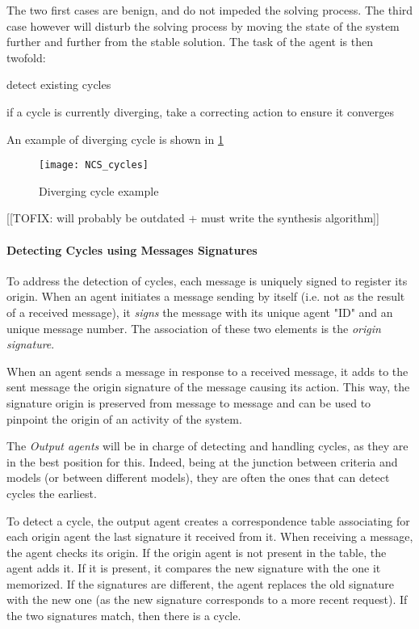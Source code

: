 The two first cases are benign, and do not impeded the solving process. The third case however will disturb the solving process by moving the state of the system further and further from the stable solution. The task of the agent is then twofold:
\begin{compactenum}
\item detect existing cycles
\item if a cycle is currently diverging, take a correcting action to ensure it converges
\end{compactenum}

An example of diverging cycle is shown in \figurename{} \ref{NCS_cycles_fig}

\begin{figure}
\centering
\texttt{[image: NCS\_cycles]}
\caption{Diverging cycle example}\label{NCS_cycles_fig}
\end{figure}

[[TOFIX: will probably be outdated + must write the synthesis algorithm]]
\paragraph*{Detecting Cycles using Messages Signatures}
To address the detection of cycles, each message is uniquely signed to register its origin. When an agent initiates a message sending by itself (i.e. not as the result of a received message), it \emph{signs} the message with its unique agent "ID" and an unique message number. The association of these two elements is the \emph{origin signature}.

When an agent sends a message in response to a received message, it adds to the sent message the origin signature of the message causing its action. This way, the signature origin is preserved from message to message and can be used to pinpoint the origin of an activity of the system.

The \emph{Output agents} will be in charge of detecting and handling cycles, as they are in the best position for this. Indeed, being at the junction between criteria and models (or between different models), they are often the ones that can detect cycles the earliest.

To detect a cycle,  the output agent creates a correspondence table associating for each origin agent the last signature it received from it. When receiving a message, the agent checks its origin. If the origin agent is not present in the table, the agent adds it. If it is present, it compares the new signature with the one it memorized. If the signatures are different, the agent replaces the old signature with the new one (as the new signature corresponds to a more recent request). If the two signatures match, then there is a cycle.

